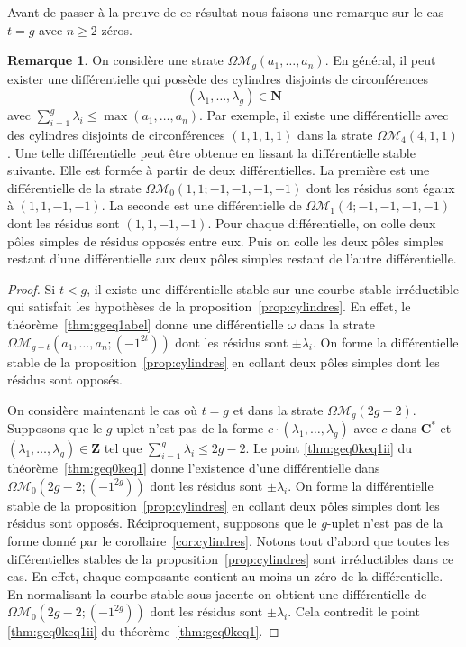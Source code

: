\documentclass[JEP,XML,SOM,Unicode,francais,NoFloatCountersInSection,published]{cedram}
\let\mathcal\mathscr
\newcommand{\CC}{\mathbf{C}}
\newcommand{\NN}{\mathbf{N}}
\newcommand{\ZZ}{\mathbf{Z}}
\newcommand{\omoduli}[1][g]{{\Omega\mathcal M}_{\!#1}}
\theoremstyle{definition}
\newtheorem{rem}[thm]{Remarque}
\begin{document}
Avant de passer à la preuve de ce résultat nous faisons une remarque sur le cas $t=g$ avec $n\geq2$ zéros.
\begin{rem}
On considère une strate $\omoduli(a_{1},\dots,a_{n})$. En général, il peut exister une différentielle qui possède des cylindres disjoints de circonférences
\[
(\lambda_{1},\dots,\lambda_{g})\in \NN
\]
avec $\sum_{i=1}^{g} \lambda_{i} \leq \max (a_{1},\dots,a_{n})$. Par exemple, il existe une différentielle avec des cylindres disjoints de circonférences $(1,1,1,1)$ dans la strate $\omoduli[4](4,1,1)$. Une telle différentielle peut être obtenue en lissant la différentielle stable suivante. Elle est formée à partir de deux différentielles. La première est une différentielle de la strate $\omoduli[0](1,1;-1,-1,-1,-1)$ dont les résidus sont égaux à $(1,1,-1,-1)$. La seconde est une différentielle de $\omoduli[1](4;-1,-1,-1,-1)$ dont les résidus sont $(1,1,-1,-1)$. Pour chaque différentielle, on colle deux pôles simples de résidus opposés entre eux. Puis on colle les deux pôles simples restant d'une différentielle aux deux pôles simples restant de l'autre différentielle.
\end{rem}

\begin{proof}
Si $t<g$, il existe une différentielle stable sur une courbe stable irréductible qui satisfait les hypothèses de la proposition~\ref{prop:cylindres}. En effet, le théorème~\ref{thm:ggeq1abel} donne une différentielle $\omega$ dans la strate $\omoduli[g-t](a_{1},\dots,a_{n};(-1^{2t}))$ dont les résidus sont $\pm \lambda_{i}$. On forme la différentielle stable de la proposition~\ref{prop:cylindres} en collant deux pôles simples dont les résidus sont opposés.

On considère maintenant le cas où $t=g$ et dans la strate $\omoduli(2g-2)$. Supposons que le $g$-uplet n'est pas de la forme $c \cdot (\lambda_{1},\dots, \lambda_{g})$ avec $c$ dans $\CC^{\ast}$ et $(\lambda_{1},\dots,\lambda_{g})\in \ZZ$ tel que $\sum_{i=1}^{g} \lambda_{i} \leq 2g-2$. Le point \eqref{thm:geq0keq1ii} du théorème~\ref{thm:geq0keq1} donne l'existence d'une différentielle dans $\omoduli[0](2g-2;(-1^{2g}))$ dont les résidus sont $\pm \lambda_{i}$. On forme la différentielle stable de la proposition~\ref{prop:cylindres} en collant deux pôles simples dont les résidus sont opposés. Réciproquement, supposons que le $g$-uplet n'est pas de la forme donné par le corollaire~\ref{cor:cylindres}. Notons tout d'abord que toutes les différentielles stables de la proposition~\ref{prop:cylindres} sont irréductibles dans ce cas. En effet, chaque composante contient au moins un zéro de la différentielle. En normalisant la courbe stable sous jacente on obtient une différentielle de $\omoduli[0](2g-2;(-1^{2g}))$ dont les résidus sont $\pm \lambda_{i}$. Cela contredit le point \eqref{thm:geq0keq1ii} du théorème~\ref{thm:geq0keq1}.
\end{proof}
\end{document}
